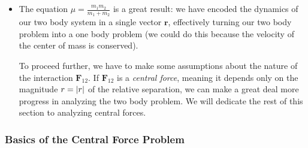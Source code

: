 \documentclass[11pt, a4paper]{article}
\begin{document}
\begin{itemize}
	\item The equation $ \mu = \frac{m_{1}m_{2}}{m_{1} + m_{2}} $ is a great result: we have encoded the dynamics of our two body system in a single vector $ \bm{r} $, effectively turning our two body problem into a one body problem (we could do this because the velocity of the center of mass is conserved).
	
	To proceed further, we have to make some assumptions about the nature of the interaction $ \bm{F}_{12} $. If $ \bm{F}_{12} $ is a \textit{central force}, meaning it depends only on the magnitude $ r = \abs{r} $ of the relative separation, we can make a great deal more progress in analyzing the two body problem. We will dedicate the rest of this section to analyzing central forces.
	

\end{itemize}

\subsubsection{Basics of the Central Force Problem}
\end{document}
